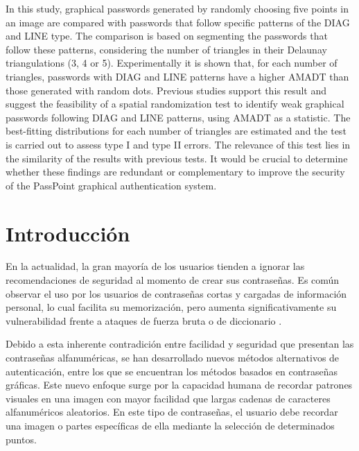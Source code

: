 \documentclass[12pt]{report}
\begin{document}
	In this study, graphical passwords generated by randomly choosing five points in an image are compared with passwords that follow specific patterns of the DIAG and LINE type. The comparison is based on segmenting the passwords that follow these patterns, considering the number of triangles in their Delaunay triangulations (3, 4 or 5). Experimentally it is shown that, for each number of triangles, passwords with DIAG and LINE patterns have a higher AMADT than those generated with random dots. Previous studies support this result and suggest the feasibility of a spatial randomization test to identify weak graphical passwords following DIAG and LINE patterns, using AMADT as a statistic. The best-fitting distributions for each number of triangles are estimated and the test is carried out to assess type I and type II errors.
	The relevance of this test lies in the similarity of the results with previous tests. It would be crucial to determine whether these findings are redundant or complementary to improve the security of the PassPoint graphical authentication system.

\tableofcontents
\newpage
\listoffigures
\newpage
\listoftables


\chapter*{Introducción}
\hypertarget{introduccion}{}


	En la actualidad, la gran mayoría de los usuarios tienden a ignorar las recomendaciones de seguridad al momento de crear sus contraseñas. Es común observar el uso por los usuarios de contraseñas cortas y cargadas de información personal, lo cual facilita su memorización, pero aumenta significativamente su vulnerabilidad frente a ataques de fuerza bruta o de diccionario \cite{1,2,3,4}.
	
	Debido a esta inherente contradición entre facilidad y seguridad que presentan las contraseñas alfanuméricas, se han desarrollado nuevos métodos alternativos de autenticación, entre los que se encuentran los métodos basados  en contraseñas gráficas. Este nuevo enfoque surge por la capacidad humana de recordar patrones visuales en una imagen con mayor facilidad que largas cadenas de caracteres alfanuméricos aleatorios. En este tipo de contraseñas, el usuario debe recordar una imagen o partes específicas de ella mediante la selección  de determinados puntos.
	
\end{document}
